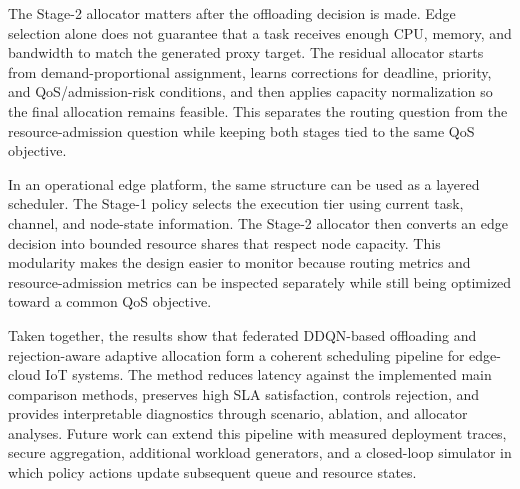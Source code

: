 The Stage-2 allocator matters after the offloading decision is made. Edge selection alone does not guarantee that a task receives enough CPU, memory, and bandwidth to match the generated proxy target. The residual allocator starts from demand-proportional assignment, learns corrections for deadline, priority, and QoS/admission-risk conditions, and then applies capacity normalization so the final allocation remains feasible. This separates the routing question from the resource-admission question while keeping both stages tied to the same QoS objective.

In an operational edge platform, the same structure can be used as a layered scheduler. The Stage-1 policy selects the execution tier using current task, channel, and node-state information. The Stage-2 allocator then converts an edge decision into bounded resource shares that respect node capacity. This modularity makes the design easier to monitor because routing metrics and resource-admission metrics can be inspected separately while still being optimized toward a common QoS objective.

Taken together, the results show that federated DDQN-based offloading and rejection-aware adaptive allocation form a coherent scheduling pipeline for edge-cloud IoT systems. The method reduces latency against the implemented main comparison methods, preserves high SLA satisfaction, controls rejection, and provides interpretable diagnostics through scenario, ablation, and allocator analyses. Future work can extend this pipeline with measured deployment traces, secure aggregation, additional workload generators, and a closed-loop simulator in which policy actions update subsequent queue and resource states.
